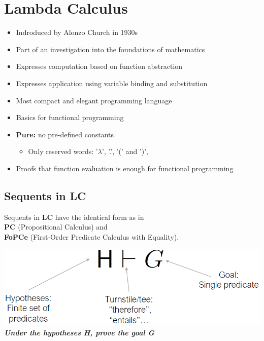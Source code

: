 
\section{Lambda Calculus}
\begin{itemize}
    \item Indroduced by Alonzo Church in 1930s
    \item Part of an investigation into the foundations of mathematics
    \item Expresses computation based on function abstraction
    \item Expresses application using variable binding and substitution
    \item Most compact and elegant programming language
    \item Basics for functional programming
    \item \textbf{Pure:} no pre-defined constants
    \begin{itemize}
        \item Only reserved words: '$\lambda$', '.', '(' and ')',
    \end{itemize}
    \item Proofs that function evaluation is enough for functional programming
\end{itemize}

\subsection{Sequents in LC}
Sequents in \textbf{LC} have the identical form as in\\
\textbf{PC} (Propositional Calculus) and \\ 
\textbf{FoPCe} (First-Order Predicate Calculus with Equality).\\
\begin{center}
    \includegraphics[width=0.8\linewidth]{img/sequents_lc.png}\\
    \textbf{\textit{Under the hypotheses H, prove the goal G}}
\end{center}

